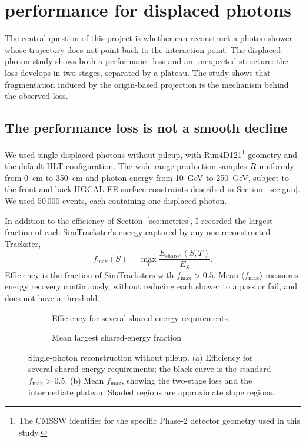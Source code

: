 \section{\cluethreed{} performance for displaced photons}
\label{sec:singlephoton}

The central question of this project is whether \cluethreed{} can reconstruct
a photon shower whose trajectory does not point back to the interaction
point. The displaced-photon study shows both a performance loss
and an unexpected structure: the loss develops in two stages, separated by a
plateau. The study shows that fragmentation induced by the origin-based
projection is the mechanism behind the observed loss.

\subsection{The performance loss is not a smooth decline}

We used single displaced photons without pileup, with Run4D121\footnote{The
CMSSW identifier for the specific Phase-2 detector geometry used in this
study.}
geometry and the default HLT \cluethreed{} configuration. The wide-range
production samples $R$ uniformly from \SI{0}{cm} to \SI{350}{cm} and photon
energy from \SI{10}{GeV} to \SI{250}{GeV}, subject to the front and
back HGCAL-EE surface constraints described in Section~\ref{sec:gun}. We used 50\,000 events, each containing one displaced photon.

In addition to the efficiency of Section~\ref{sec:metrics}, I recorded the
largest fraction of each SimTrackster's energy captured by any one
reconstructed Trackster,
\begin{equation}
  f_{\max}(S)=\max_T\frac{E_{\mathrm{shared}}(S,T)}{E_S}.
  \label{eq:fmax}
\end{equation}
Efficiency is the fraction of SimTracksters with $f_{\max}>0.5$. Mean
$\langle f_{\max}\rangle$ measures energy recovery continuously, without
reducing each shower to a pass or fail, and does not have a threshold.

\begin{figure}[!tp]
  \centering
  \begin{subfigure}[t]{0.54\textwidth}
    \caption{Efficiency for several shared-energy requirements}
  \end{subfigure}\hfill
  \begin{subfigure}[t]{0.44\textwidth}
    \caption{Mean largest shared-energy fraction}
  \end{subfigure}
  \caption{Single-photon reconstruction without pileup. (a) Efficiency for
  several shared-energy requirements; the black curve is the standard
  $f_{\max}>0.5$. (b) Mean $f_{\max}$, showing the two-stage loss and the
  intermediate plateau. Shaded regions are approximate slope regions.}
  \label{fig:singlephotonperformance}
\end{figure}


